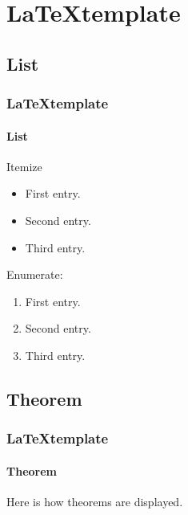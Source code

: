\def\sectiontitle{\LaTeX template}

\section{\sectiontitle}

\def\slidetitle{List}

\subsection{\slidetitle}
\begin{frame}
  \frametitle{\sectiontitle}
  \framesubtitle{\slidetitle}

  Itemize

  \begin{itemize}
    \item First entry.
    \item Second entry.
    \item Third entry.
  \end{itemize}

  Enumerate:

  \begin{enumerate}
    \item First entry.
    \item Second entry.
    \item Third entry.
  \end{enumerate}
\end{frame}

\def\slidetitle{Theorem}

\subsection{\slidetitle}
\begin{frame}
  \frametitle{\sectiontitle}
  \framesubtitle{\slidetitle}

  \begin{theorem}[Example]
    Here is how theorems are displayed.
  \end{theorem}
\end{frame}

\def\slidetitle{Images}

